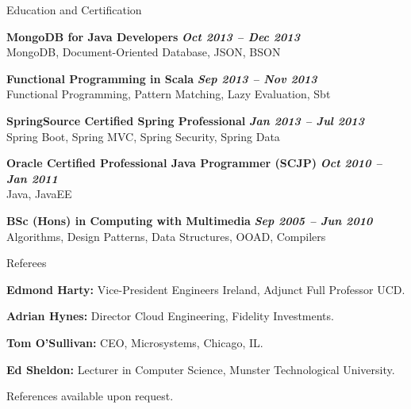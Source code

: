 \documentclass{résumé}
\begin{document}
\begin{rSection}{Education and Certification}

{\bf MongoDB for Java Developers} \hfill {\em \textbf{Oct 2013 – Dec 2013}} 
\\ \normalfont MongoDB, Document-Oriented Database, JSON, BSON
    
{\bf Functional Programming in Scala} \hfill {\em \textbf{Sep 2013 – Nov 2013}} 
\\ \normalfont Functional Programming, Pattern Matching, Lazy Evaluation, Sbt
    
{\bf SpringSource Certified Spring Professional} \hfill {\em \textbf{Jan 2013 – Jul 2013}} 
\\ \normalfont Spring Boot, Spring MVC, Spring Security, Spring Data
    
{\bf Oracle Certified Professional Java Programmer (SCJP)} \hfill {\em \textbf{Oct 2010 – Jan 2011}} 
\\ \normalfont Java, JavaEE
    
{\bf BSc (Hons) in Computing with Multimedia} \hfill {\em \textbf{Sep 2005 – Jun 2010}} 
\\ \normalfont Algorithms, Design Patterns, Data Structures, OOAD, Compilers

\end{rSection}

\begin{rSection}{Referees}
\item \textbf{Edmond Harty:} Vice-President Engineers Ireland, Adjunct Full Professor UCD.
\item \textbf{Adrian Hynes:} Director Cloud Engineering, Fidelity Investments.
\item \textbf{Tom O'Sullivan:} CEO, Microsystems, Chicago, IL.
\item \textbf{Ed Sheldon:} Lecturer in Computer Science, Munster Technological University.
\item \normalfont References available upon request.
\end{rSection}
\end{document}
